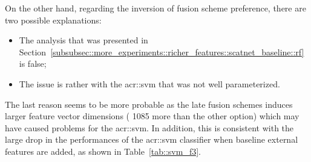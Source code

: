             On the other hand, regarding the inversion of fusion scheme preference, there are two possible explanations:
            \begin{itemize}[label=\(\blacktriangleright\)]
                \item The analysis that was presented in Section~\ref{subsubsec::more_experiments::richer_features::scatnet_baseline::rf} is false;
                \item The issue is rather with the \gls{acr::svm} that was not well parameterized.
            \end{itemize}
            The last reason seems to be more probable as the late fusion schemes induces larger feature vector dimensions ( 1085 more than the other option) which may have caused problems for the \gls{acr::svm}.
            In addition, this is consistent with the large drop in the performances of the \gls{acr::svm} classifier when baseline external features are added, as shown in Table~\ref{tab::svm_f3}.\\

